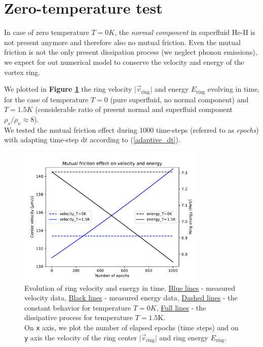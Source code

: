 \newpage


\section{Zero-temperature test}

In case of zero temperature $T=0\unit{K}$, the \textit{normal component} in superfluid He-II is not present anymore and therefore also no mutual friction. Even the mutual friction is not the only present dissipation process (we neglect phonon emissions), we expect for out numerical model to conserve the velocity and energy of the vortex ring.

We plotted in \textbf{Figure \ref{Tzero}} the ring velocity $\vert \vec{v}_{\text{ring}} \vert $ and energy $E_{\text{ring}}$ evolving in time, for the case of temperature $T=0$ (pure superfluid, no normal component) and $T=1.5\unit{K}$ (considerable ratio of present normal and superfluid component $\rho_s / \rho_n \approx 8$).\\
We tested the mutual friction effect during 1000 time-steps (referred to as \textit{epochs}) with adapting time-step $\text{d}t$ according to (\ref{adaptive_dt}).

\begin{figure}[h]
	\centering
	\includegraphics[width=0.8\textwidth]{graphics/results/Tzero}
	\caption{Evolution of ring velocity and energy in time. \underline{Blue lines} - measured velocity data, \underline{Black lines} - measured energy data,
	\underline{Dashed lines} - the constant behavior for temperature $T=0\unit{K}$, \underline{Full lines} - the dissipative process for temperature $T=1.5\text{K}$.\\
	On \texttt{x} axis, we plot the number of elapsed epochs (time steps) and on \texttt{y} axis the velocity of the ring center $\vert \vec{v}_{\text{ring}} \vert $ and ring energy $E_{\text{ring}}$.}
	\label{Tzero}
\end{figure}

